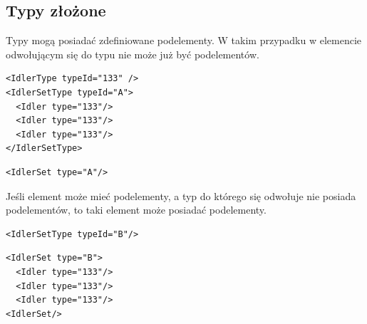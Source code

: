 \documentclass[12pt,a4paper]{article}
\begin{document}
\subsection{Typy złożone}
Typy mogą posiadać zdefiniowane podelementy.  W takim przypadku w elemencie
odwołującym się do typu nie może już być podelementów. 

\begin{verbatim}
<IdlerType typeId="133" />
<IdlerSetType typeId="A">
  <Idler type="133"/>
  <Idler type="133"/>
  <Idler type="133"/>
</IdlerSetType>
\end{verbatim}

\begin{verbatim}
<IdlerSet type="A"/>
\end{verbatim}

Jeśli element może mieć podelementy, a typ do którego się odwołuje nie posiada
podelementów, to taki element może posiadać podelementy.

\begin{verbatim}
<IdlerSetType typeId="B"/>
\end{verbatim}

\begin{verbatim}
<IdlerSet type="B">
  <Idler type="133"/>
  <Idler type="133"/>
  <Idler type="133"/>
<IdlerSet/>
\end{verbatim}
\end{document}
